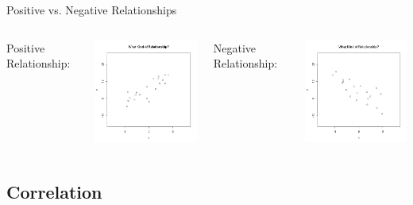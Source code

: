 \begin{frame}{Positive vs. Negative Relationships}

  \begin{columns}
    Positive Relationship: \\
    \centerline{\includegraphics[width=5cm]{img/week2Day3ClickerQuizPos}}
    Negative Relationship: \\
    \centerline{\includegraphics[width=5cm]{img/week2Day3ClickerQuizNeg}}
  \end{columns}
  
\end{frame}



\subsection{Correlation}

